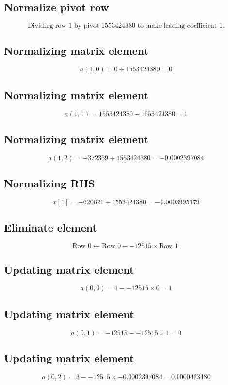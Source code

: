 \documentclass{article}
\begin{document}
\subsection*{ \vspace{1em} Normalize pivot row}
\[
\text{Dividing row } 1 \text{ by pivot } 1553424380 \text{ to make leading coefficient } 1.
\]
\subsection*{ \vspace{1em} Normalizing matrix element}
\[
a( 1,0 ) = 0 \div 1553424380 = 0
\]
\subsection*{ \vspace{1em} Normalizing matrix element}
\[
a( 1,1 ) = 1553424380 \div 1553424380 = 1
\]
\subsection*{ \vspace{1em} Normalizing matrix element}
\[
a( 1,2 ) = -372369 \div 1553424380 = -0.0002397084
\]
\subsection*{ \vspace{1em} Normalizing RHS}
\[
x[1] = -620621 \div 1553424380 = -0.0003995179
\]
\subsection*{ \vspace{1em} Eliminate element}
\[
\text{Row } 0 \leftarrow \text{Row }0 - -12515 \times \text{Row } 1.
\]
\subsection*{ \vspace{1em} Updating matrix element}
\[
a(0,0 ) = 1 - -12515 \times 0 = 1
\]
\subsection*{ \vspace{1em} Updating matrix element}
\[
a(0,1 ) = -12515 - -12515 \times 1 = 0
\]
\subsection*{ \vspace{1em} Updating matrix element}
\[
a(0,2 ) = 3 - -12515 \times -0.0002397084 = 0.0000483480
\]
\end{document}
